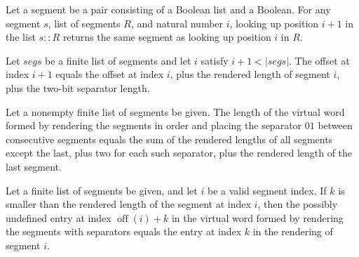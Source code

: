 \begin{lemma}
\label{Complexity.LogProg.seg_cons_succ}
\leanok
{}
Let a segment be a pair consisting of a Boolean list and a Boolean. For any segment $s$,
list of segments $R$, and natural number $i$, looking up position $i+1$ in the list $s
:: R$ returns the same segment as looking up position $i$ in $R$.
\end{lemma}

\begin{lemma}
\label{Complexity.LogProg.off_succ}
\leanok
{}
Let $segs$ be a finite list of segments and let $i$ satisfy $i+1<|segs|$. The offset at
index $i+1$ equals the offset at index $i$, plus the rendered length of segment $i$,
plus the two-bit separator length.
\end{lemma}

\begin{lemma}
\label{Complexity.LogProg.length_vword}
\leanok
{}
Let a nonempty finite list of segments be given. The length of the virtual word formed
by rendering the segments in order and placing the separator $01$ between consecutive
segments equals the sum of the rendered lengths of all segments except the last, plus
two for each such separator, plus the rendered length of the last segment.
\end{lemma}

\begin{lemma}
\leanok
{}
Let a finite list of segments be given, and let $i$ be a valid segment index. If $k$ is
smaller than the rendered length of the segment at index $i$, then the possibly
undefined entry at index $\operatorname{off}(i)+k$ in the virtual word formed by
rendering the segments with separators equals the entry at index $k$ in the rendering of
segment $i$.
\end{lemma}

